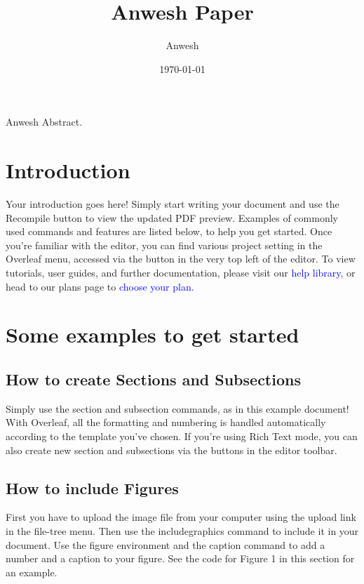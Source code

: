 \documentclass{article}
\title{Anwesh Paper}
\author{Anwesh}
\date{\today}
\begin{document}
\maketitle
\begin{abstract}
	
\end{abstract}
Anwesh Abstract.
\section{Introduction}
Your introduction goes here! Simply start writing your document and use the Recompile button to
view the updated PDF preview. Examples of commonly used commands and features are listed below,
to help you get started.
Once you’re familiar with the editor, you can find various project setting in the Overleaf menu,
accessed via the button in the very top left of the editor. To view tutorials, user guides, and further
documentation, please visit our \textcolor{blue}{help library}, or head to our plans page to \textcolor{blue}{choose your plan.}
\section{Some examples to get started}
\subsection{How to create Sections and Subsections}
Simply use the section and subsection commands, as in this example document! With Overleaf, all
the formatting and numbering is handled automatically according to the template you’ve chosen. If
you’re using Rich Text mode, you can also create new section and subsections via the buttons in the
editor toolbar.
\subsection{How to include Figures}
First you have to upload the image file from your computer using the upload link in the file-tree menu.
Then use the includegraphics command to include it in your document. Use the figure environment
and the caption command to add a number and a caption to your figure. See the code for Figure 1 in
this section for an example.\\
\end{document}
